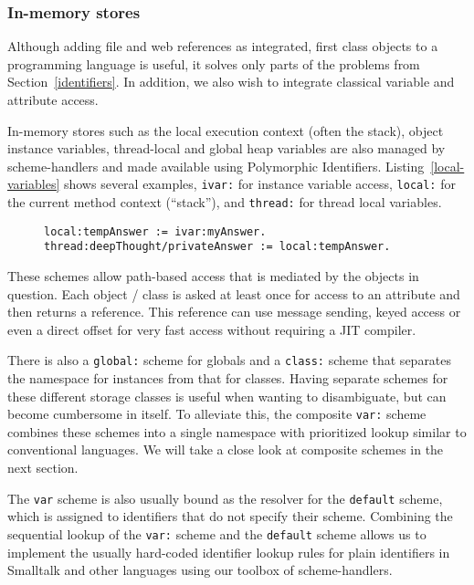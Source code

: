 \documentclass[preprint]{sigplanconf}
\begin{document}
\subsubsection{In-memory stores}

\label{inmemory}

Although adding file and web references as integrated, first class objects to a programming
language is useful, it solves only parts of the problems from Section~\ref{identifiers}.
In addition, we also wish to integrate classical variable and attribute access.

In-memory stores such as the local execution context (often the stack), object instance
variables, thread-local and global heap variables are also managed by scheme-handlers
and made available using Polymorphic Identifiers.  Listing~\ref{local-variables} shows
several examples, {\tt ivar:} for instance variable access, {\tt local:} for the current
method context (``stack''), and {\tt thread:} for thread local variables.

\begin{figure}[htbp]
\begin{lstlisting}[style=numbers,label=local-variables,caption=Different memory variables.]
local:tempAnswer := ivar:myAnswer.
thread:deepThought/privateAnswer := local:tempAnswer.
\end{lstlisting}
\end{figure}

These schemes allow path-based access
that is mediated by the objects in question.   Each object / class is asked at least
once for access to an attribute and then returns a reference.   This reference can
use message sending, keyed access or even a direct offset for very fast
access without requiring a JIT compiler.

There is also a {\tt global:} scheme for globals and a {\tt class:} scheme that separates
the namespace for instances from that for classes.  Having separate schemes for
these different storage classes is useful when wanting to disambiguate,
but can become cumbersome in itself.  To alleviate this, the composite
{\tt var:} scheme combines these schemes into a single namespace
with prioritized lookup similar to conventional languages.  We will take
a close look at composite schemes in the next section.  

The {\tt var} scheme is also usually bound as the resolver for the {\tt default}
scheme, which is assigned to identifiers that do not specify their scheme.
Combining the sequential lookup of the {\tt var:} scheme and the {\tt default}
scheme allows us to implement the usually hard-coded identifier lookup
rules for plain identifiers in Smalltalk and other languages using
our toolbox of scheme-handlers.
\end{document}
